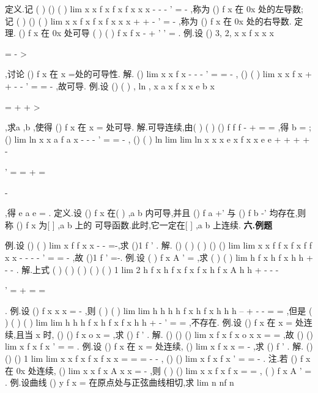 \textcolor{lyred}{定义}.记
(
)
()
(
)
lim
x
x
f x
f x
f
x
x
x
-
-
\to 
-
'
=
-
,称为
()
f x 在
0x 处的\textcolor{lyred}{左导数}; 
记
(
)
()
(
)
lim
x
x
f x
f x
f
x
x
x
+
+
\to 
-
'
=
-
,称为
()
f x 在
0x 处的\textcolor{lyred}{右导数}. 
\textcolor{lyred}{定理}.
()
f x 在
0x 处可导
(
)
(
)
f
x
f
x
-
+
'
'
\Leftrightarrow 
=
. 
\textcolor{lyred}{例}.设
()
3,
2,
x
x
f x
x
x

\le 
=
-
>

,讨论
()
f x 在
x =处的可导性. 
解.
()
lim
x
x
f
x
-
-
\to 
-
'
=
=
-
,
()
(
)
lim
x
x
f
x
+
+
\to 
-
-
'
=
=
-
,故可导. 
\textcolor{lyred}{例}.设
()
(
)
,
ln
,
x
a
x
f x
x
e
b
x

\le 

=
+
+
>

,求a ,b ,使得
()
f x 在
x =
处可导. 
解.可导\Rightarrow 连续,由(
)
(
)
()
f
f
f
-
+
=
=
,得
b =
; 
()
lim
ln
x
x
a
f
a
x
-
-
\to 
-
'
=
=
-
,
()
(
)
ln
lim
lim
ln
x
x
x
e
x
f
x
x
e
e
+
+
+
\to 
\to 
+
-


'
=
=
+
=


-


,得
e
a
e
=
. 
\textcolor{lyred}{定义}.设
()
f x 在(
)
,a b 内可导,并且
()
f
a
+'
与
()
f
b
-'
均存在,则称
()
f x 为[
]
,a b 上的 
\textcolor{lyred}{可导函数}.此时,它一定在[
]
,a b 上连续. 
\vspace{4pt}
{\bfseries \textcolor{lyred}{六.例题}}

\textcolor{lyred}{例}.设
()
(
)
lim
x
f
f
x
x
\to 
-
-
=-,求
()1
f '
. 
解.
()
(
)
(
)
()
()
lim
lim
x
x
f
f
x
f
x
f
f
x
x
\to 
\to 
-
-
-
-
'
=
=
-
,故
()1
f '
=-. 
\textcolor{lyred}{例}.设
(
)
f
x
A
'
=
,求
(
)
(
)
lim
h
f x
h
f x
h
h
\to 
+
-
-
. 
解.上式
(
)
(
)
(
)
(
)
(
)
1 lim
2 h
f x
h
f x
f x
f x
h
f
x
A
h
h
\to 
+
-
-
-


'
=
+
=
=




. 
\textcolor{lyred}{例}.设
()
f x
x
x
=
-
,则
(
)
(
)
lim
lim
h
h
h
h
f x
h
f x
h
h
h
\to 
\to 
--
+
-
-
=
=
,但是 
(
)
(
)
(
)
lim
lim
h
h
h
f x
h
f x
f
x
h
h
\to 
\to 
+
-
'
=
=
,不存在. 
\textcolor{lyred}{例}.设
()
f x 在
x =
处连续,且当
x \to 
时,
()
()
f x
o x
=
,求
()
f '
. 
解.
()
()
()
lim
x
f x
f x
o x
x
\to 
=
\Rightarrow 
=
,故
()
()
lim
x
f x
f
x
\to 
'
=
=
. 
\textcolor{lyred}{例}.设
()
f x 在
x =
处连续,
()
lim
x
f x
x
\to 
=
-
,求
()
f '
. 
解.
()
()
()
1 lim
lim
x
x
f x
f x
f
x
x
\to 
\to 
=\Rightarrow 
=
\Rightarrow 
=
-
-
,
()
()
lim
x
f x
f
x
\to 
'
=
=
-
. 
\textcolor{lyred}{注}.若
()
f x 在
0x 处连续,
()
lim
x
x
f x
A
x
x
\to 
=
-
,则
(
)
()
lim
x
x
f x
f x
\to 
=
=
,
(
)
f
x
A
'
=
. 
\textcolor{lyred}{例}.设曲线
()
y
f x
=
在原点处与正弦曲线相切,求
lim
n
nf
n
\to \infty 






